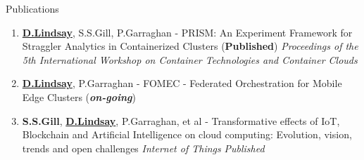 \documentclass{resume} %
\begin{document}
\begin{rSection}{Publications}
		
%		
%		
		\begin{enumerate}
			\item \textbf{\underline{D.Lindsay}}, S.S.Gill, P.Garraghan - PRISM: An Experiment Framework for Straggler Analytics in Containerized Clusters (\textbf{\mbox{Published}})
			\newline \textit{Proceedings of the 5th International Workshop on Container Technologies and Container Clouds} 
			
			
				\item \textbf{\underline{D.Lindsay}}, P.Garraghan - FOMEC - Federated Orchestration for Mobile Edge Clusters  (\mbox{\textbf{\textit{on-going}}})
				
				\item \textbf{S.S.Gill}, \textbf{\underline{D.Lindsay}}, P.Garraghan, et al - Transformative effects of IoT, Blockchain and Artificial Intelligence on cloud computing: Evolution, vision, trends and open challenges 
				\newline \textit{Internet of Things}  \textit{Published}
		\end{enumerate}


\end{rSection}
\end{document}
